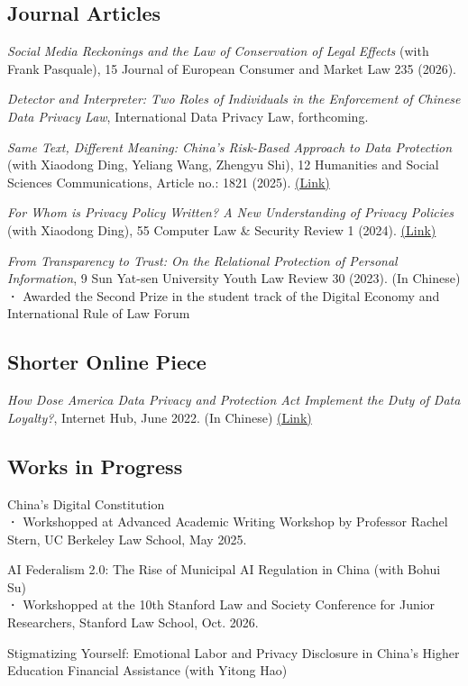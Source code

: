 \documentclass[a4paper,9pt]{extarticle}
\begin{document}
\subsection*{Journal Articles}
\textit{Social Media Reckonings and the Law of Conservation of Legal Effects} (with Frank Pasquale), 15 Journal of European Consumer and Market Law 235 (2026). \\
\par\medskip
\textit{Detector and Interpreter: Two Roles of Individuals in the Enforcement of Chinese Data Privacy Law}, International Data Privacy Law, forthcoming. \\
\par\medskip
\textit{Same Text, Different Meaning: China's Risk-Based Approach to Data Protection} (with Xiaodong Ding, Yeliang Wang, Zhengyu Shi), 12 Humanities and Social Sciences Communications, Article no.: 1821 (2025). \href{https://papers.ssrn.com/sol3/papers.cfm?abstract_id=5798043}{(Link)}\\
\par\medskip
\textit{For Whom is Privacy Policy Written? A New Understanding of Privacy Policies} (with Xiaodong Ding), 55 Computer Law \& Security Review 1 (2024). \href{https://papers.ssrn.com/sol3/papers.cfm?abstract_id=4560201}{(Link)}\\
\par\medskip
\textit{From Transparency to Trust: On the Relational Protection of Personal Information}, 9 Sun Yat-sen University Youth Law Review 30 (2023). (In Chinese)\\
\textbf{·}  Awarded the Second Prize in the student track of the Digital Economy and International Rule of Law Forum
\subsection*{Shorter Online Piece}
\textit{How Dose America Data Privacy and Protection Act Implement the Duty of Data Loyalty?}, Internet Hub, June 2022. (In Chinese) \href{https://mp.weixin.qq.com/s/wAZjux-BUfNYlng_33IoGg}{(Link)}
\subsection*{Works in Progress}
China's Digital Constitution\\
\textbf{·} Workshopped at Advanced Academic Writing Workshop by Professor Rachel Stern, UC Berkeley Law School, May 2025.\\
\par\medskip
AI Federalism 2.0: The Rise of Municipal AI Regulation in China (with Bohui Su)\\
\textbf{·} Workshopped at the 10th Stanford Law and Society Conference for Junior Researchers, Stanford Law School, Oct. 2026.\\
\par\medskip
Stigmatizing Yourself: Emotional Labor and Privacy Disclosure in China’s Higher Education Financial Assistance (with Yitong Hao)\\
\end{document}
